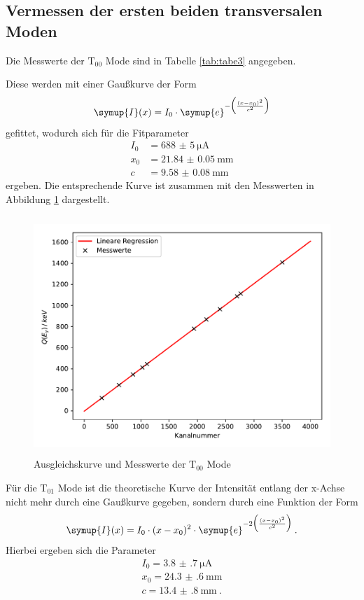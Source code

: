 \subsection{Vermessen der ersten beiden transversalen Moden}
Die Messwerte der $\text{T}_{00}$ Mode sind in Tabelle \ref{tab:tabe3} angegeben.

Diese werden
mit einer Gaußkurve der Form
\begin{equation}
  \symup{I}(x) =I_0\cdot \symup{e}^{-\Bigl(\frac{(x-x_0)^2}{c^2}\Bigr)}
  \label{eqn:gausk}
\end{equation}
gefittet, wodurch sich für die Fitparameter
\begin{align*}
  I_0 &= \SI{688(5)}{\micro\ampere} \\
  x_0 &= \SI{21.84(5)}{\milli\meter} \\
  c &= \SI{9.58(8)}{\milli\meter}
\end{align*}
ergeben. Die entsprechende Kurve ist zusammen mit den Messwerten in Abbildung \ref{fig:plot3}
dargestellt.
\begin{figure}
  \centering
  \includegraphics[height=9cm]{Plot3.pdf}
  \caption{Ausgleichskurve und Messwerte der $\text{T}_{00}$ Mode}
  \label{fig:plot3}
\end{figure}
Für die $\text{T}_{01}$ Mode ist die theoretische Kurve der Intensität entlang der x-Achse nicht mehr
durch eine Gaußkurve gegeben, sondern durch eine Funktion der Form
\begin{equation}
  \symup{I}(x) =I_0\cdot(x-x_0)^2 \cdot \symup{e}^{-2\Bigl(\frac{(x-x_0)^2}{c^2}\Bigr)} \: .
  \label{eqn:gausk}
\end{equation}
Hierbei ergeben sich die Parameter
\begin{align*}
  I_0 = \SI{3.8(7)}{\micro\ampere} \\
  x_0 = \SI{24.3(6)}{\milli\meter} \\
  c = \SI{13.4(8)}{\milli\meter} \: .
\end{align*}
